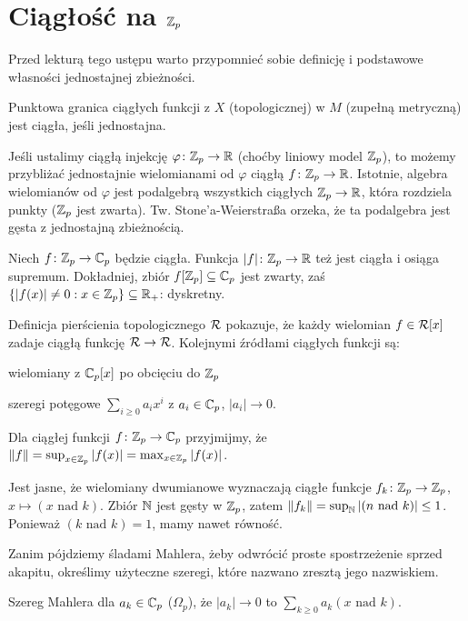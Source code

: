 \section{Ciągłość na $\mathbb Z_p$}
Przed lekturą tego ustępu warto przypomnieć sobie definicję i podstawowe własności jednostajnej zbieżności.

Punktowa granica ciągłych funkcji z $X$ (topologicznej) w $M$ (zupełną metryczną) jest ciągła, jeśli jednostajna.

Jeśli ustalimy ciągłą injekcję $\varphi \colon \mathbb Z_p \to \mathbb R$ (choćby liniowy model $\mathbb Z_p$), to możemy przybliżać jednostajnie wielomianami od $\varphi$ ciągłą $f \colon \mathbb Z_p \to \mathbb R$. 
Istotnie, algebra wielomianów od $\varphi$ jest podalgebrą wszystkich ciągłych $\mathbb Z_p \to \mathbb R$, która rozdziela punkty ($\mathbb Z_p$ jest zwarta).
Tw. Stone'a-Weierstraßa orzeka, że ta podalgebra jest gęsta z jednostajną zbieżnością.

Niech $f \colon \mathbb Z_p \to \mathbb C_p$ będzie ciągła.
Funkcja $|f| \colon \mathbb Z_p \to \mathbb R$ też jest ciągła i osiąga supremum.
Dokładniej, zbiór $f[\mathbb Z_p] \subseteq \mathbb C_p$ jest zwarty, zaś $\{|f(x)| \neq 0 : x \in \mathbb Z_p\} \subseteq \mathbb R_+$: dyskretny.

Definicja pierścienia topologicznego $\mathcal R$ pokazuje, że każdy wielomian $f \in \mathcal R[x]$ zadaje ciągłą funkcję $\mathcal R \to \mathcal R$.
Kolejnymi źródłami ciągłych funkcji są:
\begin{enumx}
	\item wielomiany z $\mathbb C_p[x]$ po obcięciu do $\mathbb Z_p$
	\item szeregi potęgowe $\sum_{i \ge 0} a_i x^i$ z $a_i \in \mathbb C_p$, $|a_i| \to 0$.
\end{enumx}

\begin{definicja}
	Dla ciągłej funkcji $f \colon \mathbb Z_p \to \mathbb C_p$ przyjmijmy, że $\|f\| = \sup_{x \in \mathbb Z_p} |f(x)| = \max_{x \in \mathbb Z_p} |f(x)|$.
\end{definicja}
	
Jest jasne, że wielomiany dwumianowe wyznaczają ciągłe funkcje $f_k \colon \mathbb Z_p \to \mathbb Z_p$, $x \mapsto (x \mbox{ nad } k)$.
Zbiór $\mathbb N$ jest gęsty w $\mathbb Z_p$, zatem $\|f_k\| = \sup_{\mathbb N}|(n \mbox{ nad } k)| \le 1$.
Ponieważ $(k \mbox{ nad } k) = 1$, mamy nawet równość.

Zanim pójdziemy śladami Mahlera, żeby odwrócić proste spostrzeżenie sprzed akapitu, określimy użyteczne szeregi, które nazwano zresztą jego nazwiskiem.

\begin{definicja}
	Szereg Mahlera dla $a_k \in \mathbb C_p$ ($\Omega_p$), że $|a_k| \to 0$ to $\sum_{k \ge 0} a_k (x \mbox{ nad } k)$.
\end{definicja}

